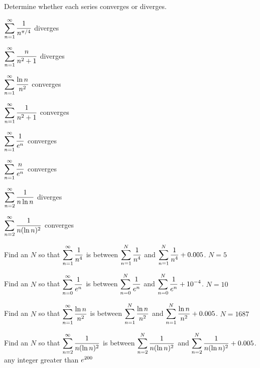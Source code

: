 \exercises

Determine whether each series converges or diverges.

\twocol

\exercise $\displaystyle\sum_{n=1}^\infty {1\over n^{\pi/4}}$
\answer diverges
\endanswer
\endexercise

\exercise $\displaystyle\sum_{n=1}^\infty {n\over n^2+1}$
\answer diverges
\endanswer
\endexercise

\exercise $\displaystyle\sum_{n=1}^\infty {\ln n\over n^2}$
\answer converges
\endanswer
\endexercise

\exercise $\displaystyle\sum_{n=1}^\infty {1\over n^2+1}$
\answer converges
\endanswer
\endexercise

\exercise $\displaystyle\sum_{n=1}^\infty {1\over e^n}$
\answer converges
\endanswer
\endexercise

\exercise $\displaystyle\sum_{n=1}^\infty {n\over e^n}$
\answer converges
\endanswer
\endexercise

\exercise $\displaystyle\sum_{n=2}^\infty {1\over n\ln n}$
\answer diverges
\endanswer
\endexercise

\exercise $\displaystyle\sum_{n=2}^\infty {1\over n(\ln n)^2}$
\answer converges
\endanswer

\endtwocol

\msk
\endexercise

\exercise Find an $N$ so that
$\displaystyle\sum_{n=1}^\infty {1\over n^4}$ is between
$\displaystyle\sum_{n=1}^N {1\over n^4}$ and
$\displaystyle\sum_{n=1}^N {1\over n^4} + 0.005$.
\answer $N=5$
\endanswer
\endexercise

\exercise Find an $N$ so that
$\displaystyle\sum_{n=0}^\infty {1\over e^n}$ is between
$\displaystyle\sum_{n=0}^N {1\over e^n}$ and
$\displaystyle\sum_{n=0}^N {1\over e^n} + 10^{-4}$.
\answer $N=10$
\endanswer
\endexercise

\exercise Find an $N$ so that
$\displaystyle\sum_{n=1}^\infty {\ln n\over n^2}$ is between
$\displaystyle\sum_{n=1}^N {\ln n\over n^2}$ and
$\displaystyle\sum_{n=1}^N {\ln n\over n^2} + 0.005$.
\answer $N=1687$
\endanswer
\endexercise

\exercise Find an $N$ so that
$\displaystyle\sum_{n=2}^\infty {1\over n(\ln n)^2}$ is between
$\displaystyle\sum_{n=2}^N {1\over n(\ln n)^2}$ and
$\displaystyle\sum_{n=2}^N {1\over n(\ln n)^2} + 0.005$.
\answer any integer greater than $\displaystyle e^{200}$
\endanswer
\endexercise

\endexercises

